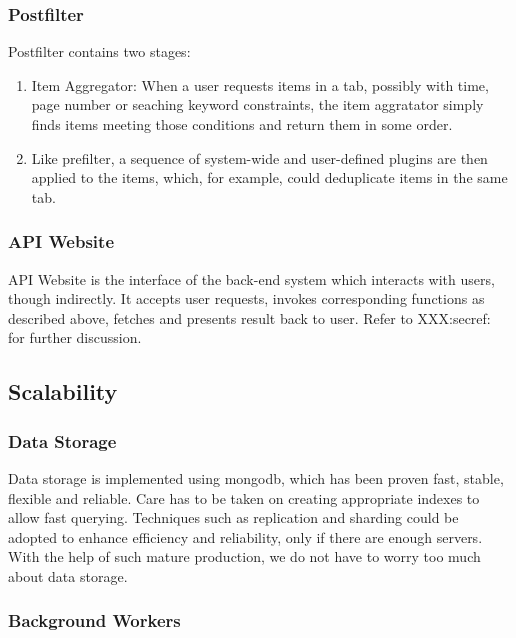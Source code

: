 \subsubsection{Postfilter}

Postfilter contains two stages:

\begin{enumerate}
\def\labelenumi{\arabic{enumi}.}
\itemsep1pt\parskip0pt
\item
  Item Aggregator: When a user requests items in a tab, possibly with
  time, page number or seaching keyword constraints, the item aggratator
  simply finds items meeting those conditions and return them in some
  order.
\item
  Like prefilter, a sequence of system-wide and user-defined plugins are
  then applied to the items, which, for example, could deduplicate items
  in the same tab.
\end{enumerate}

\subsubsection{API Website}

API Website is the interface of the back-end system which interacts with
users, though indirectly. It accepts user requests, invokes
corresponding functions as described above, fetches and presents result
back to user. Refer to XXX:secref: for further discussion.

\subsection{Scalability}

\subsubsection{Data Storage}

Data storage is implemented using mongodb, which has been proven fast,
stable, flexible and reliable. Care has to be taken on creating
appropriate indexes to allow fast querying. Techniques such as
replication and sharding could be adopted to enhance efficiency and
reliability, only if there are enough servers. With the help of such
mature production, we do not have to worry too much about data storage.

\subsubsection{Background Workers}

